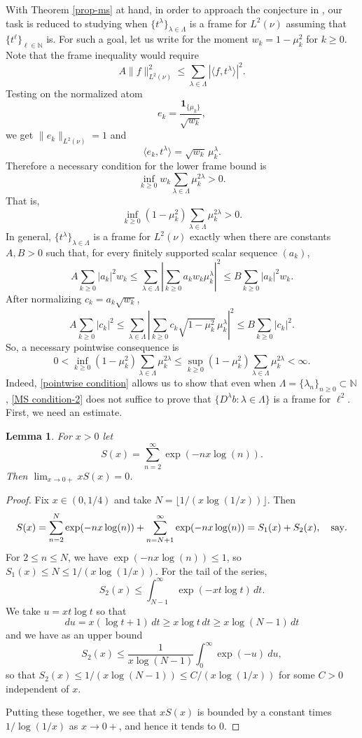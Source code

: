 \documentclass[11pt]{amsart}
\newtheorem{lem}[thm]{Lemma}
\theoremstyle{definition}
\theoremstyle{remark}
\numberwithin{equation}{section}
\begin{document}
With Theorem \ref{prop-ms} at hand, in order to approach the conjecture in \cite{ACKM25}, our task is reduced to studying when $\{t^\lambda\}_{\lambda\in\Lambda}$ is a frame for $L^2(\nu)$ assuming that $\{t^\ell\}_{\ell\in\mathbb{N}}$ is. For such a goal, let us write for the moment $w_k = 1 - \mu_k^2$ for $k\geq 0$. Note that the frame inequality would require
\[
A \|f\|_{L^2(\nu)}^2
\le
\sum_{\lambda \in \Lambda}
|\langle f, t^\lambda \rangle|^2.
\]
Testing on the normalized atom
\begin{equation}\label{ek}
e_k =
\frac{\mathbf{1}_{\{\mu_k\}}}{\sqrt{w_k}},
\end{equation}
we get
$
\|e_k\|_{L^2(\nu)} = 1
$
and
\[
\langle e_k, t^\lambda \rangle
=
\sqrt{w_k}\,\mu_k^\lambda.
\]
Therefore a necessary condition for the lower frame bound is
\[
\inf_{k\geq 0}
w_k
\sum_{\lambda \in \Lambda}
\mu_k^{2\lambda}
> 0.
\]
That is,
\[
\inf_{k\geq 0}
(1 - \mu_k^2)
\sum_{\lambda \in \Lambda}
\mu_k^{2\lambda}
> 0.
\]
In general, $\{t^\lambda\}_{\lambda \in \Lambda}$ is a frame for $L^2(\nu)$ exactly when there are constants $A,B > 0$ such that, for every finitely supported scalar sequence $(a_k)$,
\[
A \sum_{k\geq 0} |a_k|^2 w_k
\le
\sum_{\lambda \in \Lambda}
\left|
\sum_{k\geq 0} a_k w_k \mu_k^\lambda
\right|^2
\le
B \sum_{k\geq 0} |a_k|^2 w_k.
\]
After normalizing \(c_k = a_k \sqrt{w_k}\),
\[
A \sum_{k\geq 0} |c_k|^2
\le
\sum_{\lambda \in \Lambda}
\left|
\sum_{k\geq 0} c_k \sqrt{1 - \mu_k^2}\, \mu_k^\lambda
\right|^2
\le
B \sum_{k\geq 0} |c_k|^2.
\]
So, a necessary pointwise consequence is
\begin{equation}\label{pointwise condition}
0 < \inf_{k\geq 0} (1 - \mu_k^2)\sum_{\lambda \in \Lambda} \mu_k^{2\lambda}
\le
\sup_{k\geq 0} (1 - \mu_k^2)\sum_{\lambda \in \Lambda} \mu_k^{2\lambda}
< \infty.
\end{equation}
Indeed, \eqref{pointwise condition} allows us to show that even when $\Lambda=\{\lambda_n\}_{n\geq 0}\subset \mathbb{N}$,  \eqref{MS condition-2} does not suffice to prove that  $\{D^{\lambda}b:\lambda\in\Lambda\}$ is a frame for $\ell^{2}$.
First, we need an estimate.

\begin{lem}\label{lem:xsx}
For $x>0$ let
\[
S(x)= \sum_{n=2}^\infty \exp(-nx\log(n)) .
\]
Then  $\lim_{x \to 0+} xS(x) =0$.
\end{lem}
\begin{proof}
Fix $x \in (0,1/4)$ and  take $N=\lfloor 1/(x \log (1/x)) \rfloor$.
Then
\[
S(x)= \sum_{n=2}^N \exp(-nx\log(n)) + \sum_{n=N+1}^\infty \exp(-nx\log(n))= S_1(x)+S_2(x), \quad \hbox{say}.
\]
For $2\le n\le N$, we have $\exp(-nx\log(n))\le 1$, so
$S_1 (x)\le N\le 1/(x \log (1/x))$. For the tail of the series,
\[
S_2(x) \le \int_{N-1}^\infty\exp(-xt\log t) \, dt.
\]
We take $u=xt \log t$ so that
\[
du=x(\log t+1)\,  dt \ge x \log t \, dt \ge x \log  (N-1) \, dt
\]
and we have as an upper bound
\[
S_2(x) \le \frac{1}{x \log (N - 1)}\int_{0}^\infty \exp(-u) \ du,
\]
so that $S_2(x) \le 1/(x \log (N-1)) \le C/(x \log (1/x))$ for some $C>0$ independent of $x$.

Putting these together, we see that $xS(x)$ is bounded by a constant times $1/\log(1/x)$ as $x \to 0+$, and hence
it tends to $0$.
\end{proof}
\end{document}
